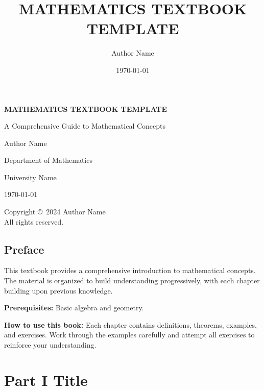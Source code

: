 \documentclass[11pt]{book}
\title{\textbf{MATHEMATICS TEXTBOOK TEMPLATE}}
\author{Author Name}
\date{\today}
\begin{document}
\begin{titlepage}
\centering
\vspace*{2cm}

{\Huge\bfseries MATHEMATICS TEXTBOOK TEMPLATE\par}
\vspace{1cm}
{\Large A Comprehensive Guide to Mathematical Concepts\par}
\vspace{2cm}

{\large Author Name\par}
\vspace{1cm}

{\large Department of Mathematics\par}
University Name\par
\vspace{1cm}

{\large \today\par}

\vfill

\end{titlepage}

\newpage
\thispagestyle{empty}
\vspace*{\fill}
\begin{center}
Copyright \copyright\ 2024 Author Name\\
All rights reserved.
\end{center}
\vspace*{\fill}

\tableofcontents
\newpage

\chapter*{Preface}

This textbook provides a comprehensive introduction to mathematical concepts. The material is organized to build understanding progressively, with each chapter building upon previous knowledge.

\textbf{Prerequisites:} Basic algebra and geometry.

\textbf{How to use this book:} Each chapter contains definitions, theorems, examples, and exercises. Work through the examples carefully and attempt all exercises to reinforce your understanding.

\part{Part I Title}
\end{document}
